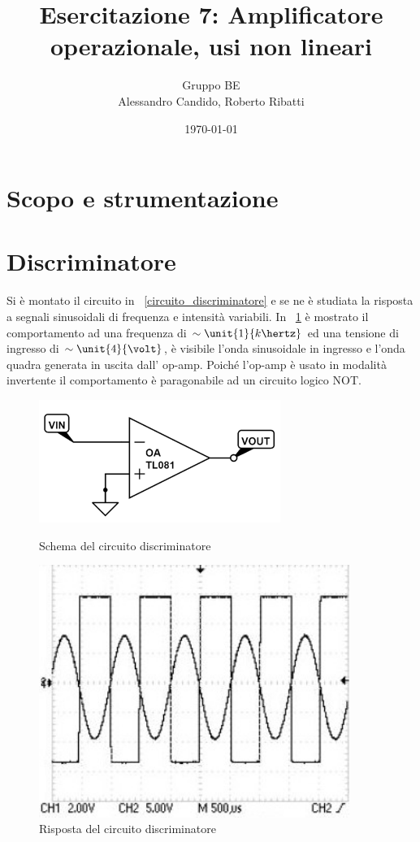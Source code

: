 \documentclass[10pt,a4paper]{article}
\title{Esercitazione 7: Amplificatore operazionale, usi non lineari}
\author{Gruppo BE \\ Alessandro Candido, Roberto Ribatti}
\date{\today}
\begin{document}
\maketitle

\section{Scopo e strumentazione}

\section{Discriminatore}
Si è montato il circuito in \figurename{~\ref{circuito_discriminatore}} e se ne è studiata la risposta a segnali sinusoidali di frequenza e intensità variabili. In \figurename{~\ref{fig:discriminator}} è mostrato il comportamento ad una frequenza di $\sim \unit{1}{k\hertz}$ ed una tensione di ingresso di $\sim\unit{4}{\volt}$, è visibile l'onda sinusoidale in ingresso e l'onda quadra generata in uscita dall' op-amp. Poiché l'op-amp è usato in modalità invertente il comportamento è paragonabile ad un circuito logico NOT.

\begin{figure}[H]
	\begin{minipage}{0.49\textwidth}
		\centering
		\includegraphics[width=0.7\textwidth]{../circuiti/discriminatore.jpg}
		\caption{Schema del circuito discriminatore}
		\label{circuito_discriminatore}
	\end{minipage}
	\begin{minipage}{0.49\textwidth}
		\centering
		\includegraphics[width=0.9\textwidth]{../oscilloscopio/discriminator.jpg}
		\caption{Risposta del circuito discriminatore}
		\label{fig:discriminator}
	\end{minipage}
\end{figure}
\end{document}
